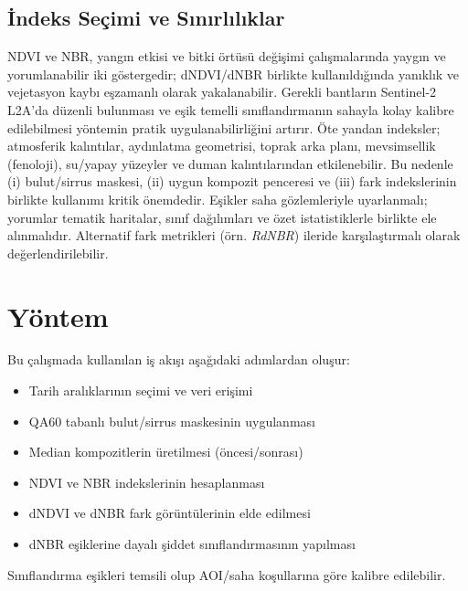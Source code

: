 \documentclass[11pt,a4paper]{article}
\begin{document}
\subsection{İndeks Seçimi ve Sınırlılıklar}
NDVI ve NBR, yangın etkisi ve bitki örtüsü değişimi çalışmalarında yaygın ve yorumlanabilir iki göstergedir; dNDVI/dNBR birlikte kullanıldığında yanıklık ve vejetasyon kaybı eşzamanlı olarak yakalanabilir. Gerekli bantların Sentinel-2 L2A'da düzenli bulunması ve eşik temelli sınıflandırmanın sahayla kolay kalibre edilebilmesi yöntemin pratik uygulanabilirliğini artırır. Öte yandan indeksler; atmosferik kalıntılar, aydınlatma geometrisi, toprak arka planı, mevsimsellik (fenoloji), su/yapay yüzeyler ve duman kalıntılarından etkilenebilir. Bu nedenle (i) bulut/sirrus maskesi, (ii) uygun kompozit penceresi ve (iii) fark indekslerinin birlikte kullanımı kritik önemdedir. Eşikler saha gözlemleriyle uyarlanmalı; yorumlar tematik haritalar, sınıf dağılımları ve özet istatistiklerle birlikte ele alınmalıdır. Alternatif fark metrikleri (örn. \emph{RdNBR}) ileride karşılaştırmalı olarak değerlendirilebilir.

\clearpage
\section{Yöntem}
Bu çalışmada kullanılan iş akışı aşağıdaki adımlardan oluşur:
\begin{itemize}
  \item Tarih aralıklarının seçimi ve veri erişimi
  \item QA60 tabanlı bulut/sirrus maskesinin uygulanması
  \item Median kompozitlerin üretilmesi (öncesi/sonrası)
  \item NDVI ve NBR indekslerinin hesaplanması
  \item dNDVI ve dNBR fark görüntülerinin elde edilmesi
  \item dNBR eşiklerine dayalı şiddet sınıflandırmasının yapılması
\end{itemize}
Sınıflandırma eşikleri temsili olup AOI/saha koşullarına göre kalibre edilebilir.
\end{document}
